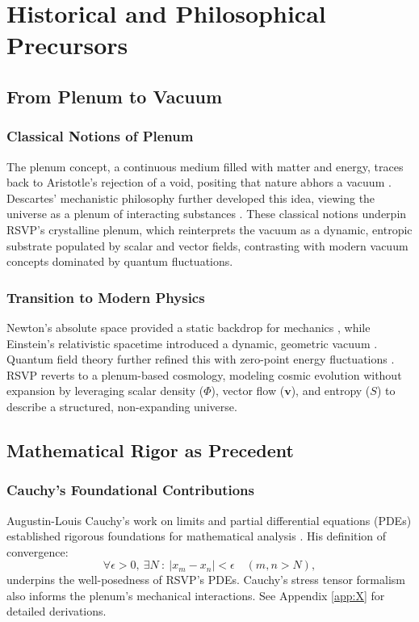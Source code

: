 \documentclass[12pt]{report}
\newcommand{\PhiRSVP}{\Phi}
\newcommand{\vRSVP}{\mathbf{v}}
\newcommand{\SRSVP}{S}
\begin{document}
\part{Historical and Philosophical Precursors}

\chapter{From Plenum to Vacuum}
\section{Classical Notions of Plenum}
The plenum concept, a continuous medium filled with matter and energy, traces back to Aristotle’s rejection of a void, positing that nature abhors a vacuum \citep{AristotlePhysics}. Descartes’ mechanistic philosophy further developed this idea, viewing the universe as a plenum of interacting substances \citep{Descartes1644}. These classical notions underpin RSVP’s crystalline plenum, which reinterprets the vacuum as a dynamic, entropic substrate populated by scalar and vector fields, contrasting with modern vacuum concepts dominated by quantum fluctuations.

\section{Transition to Modern Physics}
Newton’s absolute space provided a static backdrop for mechanics \citep{Newton1687}, while Einstein’s relativistic spacetime introduced a dynamic, geometric vacuum \citep{Einstein1915}. Quantum field theory further refined this with zero-point energy fluctuations \citep{Dirac1930}. RSVP reverts to a plenum-based cosmology, modeling cosmic evolution without expansion by leveraging scalar density (\(\PhiRSVP\)), vector flow (\(\vRSVP\)), and entropy (\(\SRSVP\)) to describe a structured, non-expanding universe.

\chapter{Mathematical Rigor as Precedent}
\section{Cauchy’s Foundational Contributions}
Augustin-Louis Cauchy’s work on limits and partial differential equations (PDEs) established rigorous foundations for mathematical analysis \citep{Cauchy1821}. His definition of convergence:
\begin{equation}
\forall \epsilon > 0, \ \exists N \ : \ |x_m - x_n| < \epsilon \quad (m, n > N), \label{eq:cauchy}
\end{equation}
underpins the well-posedness of RSVP’s PDEs. Cauchy’s stress tensor formalism also informs the plenum’s mechanical interactions. See Appendix \ref{app:X} for detailed derivations.
\end{document}
